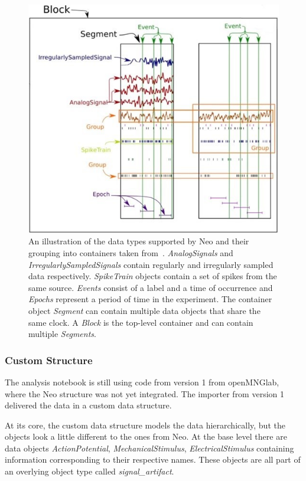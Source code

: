 \begin{figure}
	\includegraphics[width = \textwidth]{src/pic/neo_structure}
	\caption{An illustration of the data types supported by Neo and their grouping into containers taken from~\cite{neo14}. \textit{AnalogSignals} and \textit{IrregularlySampledSignals} contain regularly and irregularly sampled data respectively. \textit{SpikeTrain} objects contain a set of spikes from the same source. \textit{Events} consist of a label and a time of occurrence and \textit{Epochs} represent a period of time in the experiment. The container object \textit{Segment} can contain multiple data objects that share the same clock. A \textit{Block} is the top-level container and can contain multiple \textit{Segments}.}
	\label{fig:neostructure}
\end{figure}

\subsubsection{Custom Structure}
The analysis notebook is still using code from version 1 from openMNGlab, where the Neo structure was not yet integrated. The importer from version 1 delivered the data in a custom data structure.

At its core, the custom data structure models the data hierarchically, but the objects look a little different to the ones from Neo. At the base level there are data objects \textit{ActionPotential}, \textit{MechanicalStimulus}, \textit{ElectricalStimulus} containing information corresponding to their respective names. These objects are all part of an overlying object type called \textit{signal\_artifact}.

